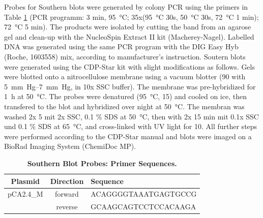 \documentclass[10pt,a4]{article}
\newcommand{\raim}[1]{\begingroup{\color{purple}#1}\endgroup}
\begin{document}
Probes for Southern blots were generated by colony PCR using the
primers in Table \ref{tab:blot} (PCR programm: 3 min,
\SI{95}{\celsius}; 35x(\SI{95}{\celsius} 30s, \SI{50}{\celsius} 30s,
\SI{72}{\celsius} 1 min); \SI{72}{\celsius} 5 min).  The products were
isolated by cutting the band from an agarose gel and clean-up with the
NucleoSpin Extract II kit (Macherey-Nagel).  Labelled DNA was
generated using the same PCR program with the DIG Easy Hyb (Roche, 1603558)
mix, according to manufacturer's instruction.
%
Soutern blots were generated using the CDP-Star kit with slight
modifications as follows.  Gels were blotted onto a nitrocellulose
membrane using a vacuum blotter  (\SI{90}{\min} with
\SIrange{5}{7}{mm Hg}, in 10x SSC buffer). The membrane was
pre-hybridized for \SI{1}{\hour} at \SI{50}{\celsius}.  The probes
were denatured (\SI{95}{\celsius}, \SI{15}{\min}) and cooled on ice,
then transfered to the blot and hybridized over night at
\SI{50}{\celsius}. The membran was washed 2x \SI{5}{\min} mit 2x SSC,
0.1 \% SDS at \SI{50}{\celsius}, then with 2x 15 min mit 0.1x SSC und
0.1 \% SDS at \SI{65}{\celsius}, and cross-linked with UV light
 for \SI{10}{\min}. All further steps were performed
according to the CDP-Star manual and \raim{blots were imaged on a
  BioRad Imaging System (ChemiDoc MP).}





\begin{table}[ht!]
  \begin{tabular}{c|c|l}
    Plasmid & Direction & Sequence \\
    \hline
    pCA2.4\_M &forward & ACAGGGGTAAATGAGTGCCG\\ %
    &reverse & GCAAGCAGTCCTCCACAAGA  %
  \end{tabular}
  \caption{\textbf{Southern Blot Probes: Primer Sequences.}}
  \label{tab:blot}
\end{table}
\end{document}
